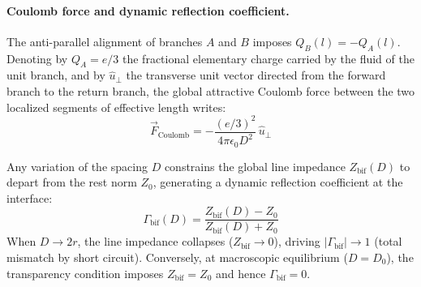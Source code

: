 \documentclass[11pt,a4paper]{article}
\theoremstyle{plain}
\theoremstyle{remark}
\begin{document}
\paragraph{Coulomb force and dynamic reflection coefficient.}
The anti-parallel alignment of branches $A$ and $B$ imposes $Q_B(l) = -Q_A(l)$. Denoting by $Q_A = e/3$ the fractional elementary charge carried by the fluid of the unit branch, and by $\hat{u}_{\perp}$ the transverse unit vector directed from the forward branch to the return branch, the global attractive Coulomb force between the two localized segments of effective length writes:
\begin{equation}
\vec{F}_{\text{Coulomb}} =
- \frac{(e/3)^2}{4\pi\epsilon_0 D^2}\,\hat{u}_{\perp}
\end{equation}

Any variation of the spacing $D$ constrains the global line impedance $Z_{\text{bif}}(D)$ to depart from the rest norm $Z_0$, generating a dynamic reflection coefficient at the interface:
\begin{equation}
\Gamma_{\text{bif}}(D) =
\frac{Z_{\text{bif}}(D) - Z_0}{Z_{\text{bif}}(D) + Z_0}
\end{equation}
When $D \rightarrow 2r$, the line impedance collapses ($Z_{\text{bif}} \rightarrow 0$), driving $|\Gamma_{\text{bif}}| \rightarrow 1$ (total mismatch by short circuit). Conversely, at macroscopic equilibrium ($D = D_0$), the transparency condition imposes $Z_{\text{bif}} = Z_0$ and hence $\Gamma_{\text{bif}} = 0$.
\end{document}
